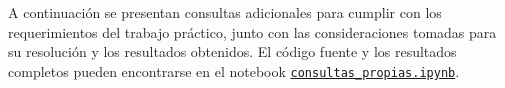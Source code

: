 A continuación se presentan consultas adicionales para cumplir con los requerimientos del trabajo práctico, junto con las consideraciones tomadas para su resolución y los resultados obtenidos. El código fuente y los resultados completos pueden encontrarse en el notebook \href{https://github.com/patricioibar/datos-tp1/blob/main/consultas_propias.ipynb}{\texttt{consultas\_propias.ipynb}}.

